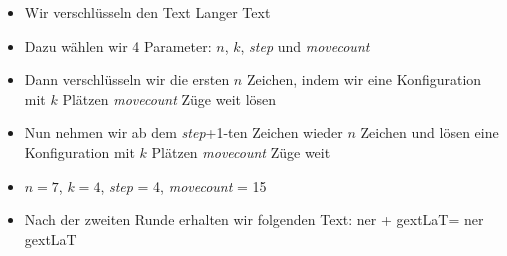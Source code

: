 \begin{frame}
        \begin{itemize}
            \item Wir verschlüsseln den Text \glqq Langer Text\grqq
            \item Dazu wählen wir 4 Parameter: $n$, $k$, \textit{step} und \textit{movecount}
            \item Dann verschlüsseln wir die ersten $n$ Zeichen, indem wir eine Konfiguration mit $k$ Plätzen \textit{movecount} Züge weit lösen
            \item Nun nehmen wir ab dem \textit{step}+1-ten Zeichen wieder $n$ Zeichen und lösen eine Konfiguration mit $k$ Plätzen \textit{movecount} Züge weit
        \end{itemize}
    \begin{myexample}
        \begin{itemize}
            \item $n=7$, $k=4$, \textit{step} = 4, \textit{movecount} = 15
            \item Nach der zweiten Runde erhalten wir folgenden Text: \glqq ner \grqq + \glqq gextLaT\grqq = \glqq ner gextLaT\grqq
        \end{itemize}
    \end{myexample}
\end{frame}